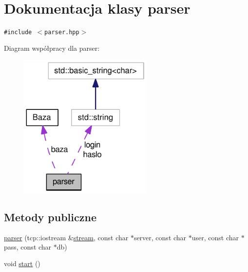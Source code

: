 \hypertarget{a00005}{
\section{Dokumentacja klasy parser}
\label{dd/dad/a00005}
}
{\tt \#include $<$parser.hpp$>$}

Diagram współpracy dla parser:\nopagebreak
\begin{figure}[H]
\begin{center}
\leavevmode
\includegraphics[width=189pt]{d9/d73/a00060}
\end{center}
\end{figure}
\subsection*{Metody publiczne}
\begin{CompactItemize}
\item 
\hyperlink{a00005_3a237071a3ab764cd61bc53df9dd4f46}{parser} (tcp::iostream \&\hyperlink{a00005_f95fb0cac229181329fa61f7bc72c65b}{stream}, const char $\ast$server, const char $\ast$user, const char $\ast$pass, const char $\ast$db)
\item 
void \hyperlink{a00005_7793913f528921aa22c4b6cc259a0a14}{start} ()
\end{CompactItemize}

